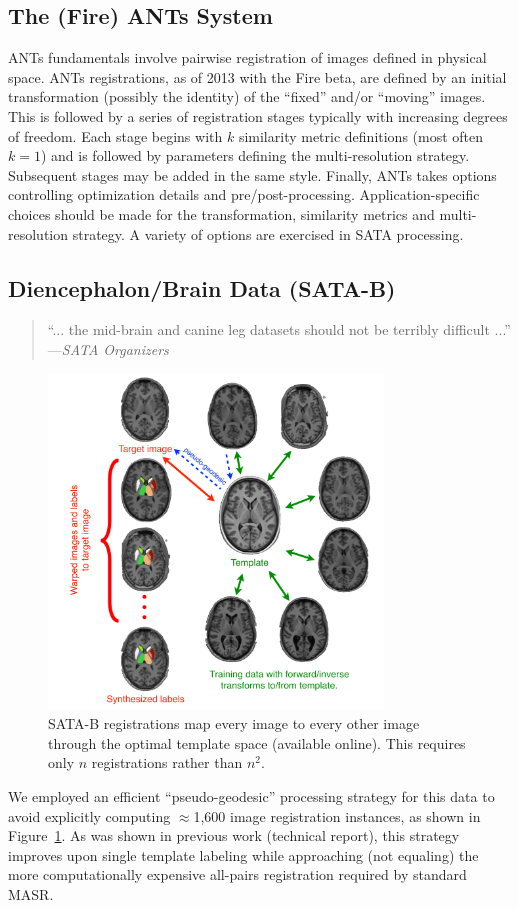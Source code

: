 \documentclass{llncs}
\begin{document}
\subsection{The (Fire) ANTs System} ANTs fundamentals involve pairwise
registration of images defined in physical space.  ANTs registrations,
as of 2013 with the Fire beta, are defined by an initial transformation (possibly the
identity) of the ``fixed'' and/or ``moving'' images.  This is followed
by a series of registration stages typically with increasing degrees
of freedom.  Each stage begins with $k$ similarity metric definitions
(most often $k=1$) and is followed by parameters defining the
multi-resolution strategy.  Subsequent stages may be added in the same
style.  Finally, ANTs takes options controlling optimization details
and pre/post-processing.  Application-specific choices should be made
for the transformation, similarity metrics and multi-resolution
strategy.  A variety of options are exercised in SATA processing.

\subsection{Diencephalon/Brain Data (SATA-B)}
 \begin{quote}
 ``... the mid-brain and canine leg
  datasets should not be terribly difficult ...'' ---{\em SATA Organizers}
\end{quote}
\begin{figure}[t]
 \centering 
  \includegraphics[width=3.5in]{../figs/SATA_diencephalon.pdf}
 \caption{SATA-B registrations map every image to every other image
   through the optimal template space (available online).  This
   requires only $n$ registrations rather than $n^2$.}
 \label{fig:Bmethods}
\end{figure}
We employed an efficient ``pseudo-geodesic'' processing strategy for this data to
avoid explicitly computing $\approx$1,600 image registration
instances, as shown in Figure~\ref{fig:Bmethods}.  As was shown in previous work (technical report), this
strategy improves upon single template labeling while approaching (not
equaling) the more computationally expensive all-pairs
registration required by standard MASR.  
\end{document}
